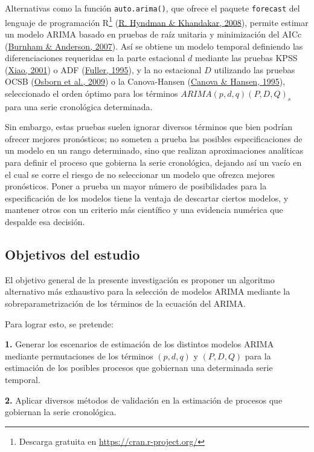 \documentclass[
]{article}
\begin{document}
Alternativas como la función \texttt{auto.arima()}, que ofrece el
paquete \texttt{forecast} del lenguaje de programación R\footnote{Descarga
  gratuita en \url{https://cran.r-project.org/}}
(\protect\hyperlink{ref-auto.arima}{R. Hyndman \& Khandakar, 2008}),
permite estimar un modelo ARIMA basado en pruebas de raíz unitaria y
minimización del AICc (\protect\hyperlink{ref-burnham2007model}{Burnham
\& Anderson, 2007}). Así se obtiene un modelo temporal definiendo las
diferenciaciones requeridas en la parte estacional \(d\) mediante las
pruebas KPSS
(\protect\hyperlink{ref-doi:10.1111ux2f1467-9892.00213}{Xiao, 2001}) o
ADF (\protect\hyperlink{ref-fuller1995introduction}{Fuller, 1995}), y la
no estacional \(D\) utilizando las pruebas OCSB
(\protect\hyperlink{ref-Osborn2009SEASONALITYAT}{Osborn et al., 2009}) o
la Canova-Hansen (\protect\hyperlink{ref-10.2307ux2f1392184}{Canova \&
Hansen, 1995}), seleccionado el orden óptimo para los términos
\(ARIMA(p, d, q)(P, D, Q)_s\) para una serie cronológica determinada.

Sin embargo, estas pruebas suelen ignorar diversos términos que bien
podrían ofrecer mejores pronósticos; no someten a prueba las posibles
especificaciones de un modelo en un rango determinado, sino que realizan
aproximaciones analíticas para definir el proceso que gobierna la serie
cronológica, dejando así un vacío en el cual se corre el riesgo de no
seleccionar un modelo que ofrezca mejores pronósticos. Poner a prueba un
mayor número de posibilidades para la especificación de los modelos
tiene la ventaja de descartar ciertos modelos, y mantener otros con un
criterio más científico y una evidencia numérica que despalde esa
decisión.

\subsection{Objetivos del estudio}

El objetivo general de la presente investigación es proponer un
algoritmo alternativo más exhaustivo para la selección de modelos ARIMA
mediante la sobreparametrización de los términos de la ecuación del
ARIMA.

Para lograr esto, se pretende:

\textbf{1.} Generar los escenarios de estimación de los distintos
modelos ARIMA mediante permutaciones de los términos \((p,d,q)\) y
\((P,D,Q)\) para la estimación de los posibles procesos que gobiernan
una determinada serie temporal.

\textbf{2.} Aplicar diversos métodos de validación en la estimación de
procesos que gobiernan la serie cronológica.
\end{document}
